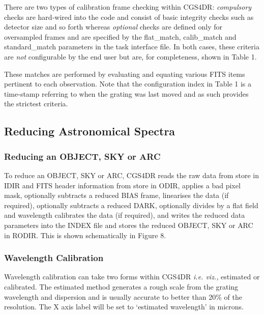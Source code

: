 {There are two types of calibration frame checking within CGS4DR: 
{\em compulsory} checks are hard-wired into the code and consist of basic 
integrity checks such as detector size and so forth whereas 
{\em optional} checks are defined only for oversampled frames and are 
specified by the {\sf flat\_match}, {\sf calib\_match} and 
{\sf standard\_match} parameters in the task interface file. In both cases, 
these criteria are {\em not} configurable by the end user but are, for 
completeness, shown in Table 1.

These matches are performed by evaluating and equating various FITS items
pertinent to each observation. Note that the configuration index in Table 1 
is a time-stamp referring to when the grating was last moved and as such 
provides the strictest criteria. 

\subsection{Reducing Astronomical Spectra}
\label{reducing_astronomical_spectra}

\subsubsection{Reducing an OBJECT, SKY or ARC}
\label{reducing_an_object_sky_or_arc}

To reduce an {\sf OBJECT}, {\sf SKY} or {\sf ARC}, CGS4DR reads the raw data 
from store in IDIR and FITS header information from store in ODIR, applies a 
bad pixel mask, optionally subtracts a reduced {\sf BIAS} frame, linearises 
the data (if required), optionally subtracts a reduced {\sf DARK}, optionally 
divides by a flat field and wavelength calibrates the data (if required),
and writes the reduced data parameters into the INDEX file and stores the 
reduced {\sf OBJECT}, {\sf SKY} or {\sf ARC} in RODIR. 
This is shown schematically in Figure 8.

\subsubsection{Wavelength Calibration}
\label{wavelength_calibration}

Wavelength calibration can take two forms within CGS4DR {\em i.e. viz.,}
estimated or calibrated. The estimated method generates a rough scale from
the grating wavelength and dispersion and is usually accurate to better
than 20\% of the resolution. The X axis label will be set to 
{\sf `estimated wavelength'} in microns.

}
